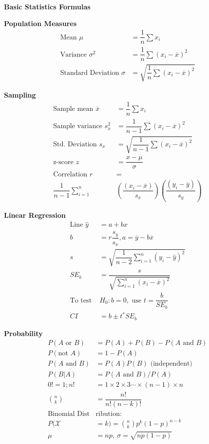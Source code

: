 \documentclass[10pt,letterpaper, landscape]{article}
\begin{document}
\thispagestyle{empty}
\setlength{\parindent}{0pt}
\setlength{\columnseprule}{0.4pt}
\setlength{\columnsep}{3ex}

{\LARGE \begin{center}
\textbf{Basic Statistics  Formulas}
\end{center}}
\begin{multicols}{3}
{\large \textbf{Population Measures}}
\begin{align}
\text{Mean } \mu &= \dfrac{1}{n}\sum x_i\\
\text{Variance } \sigma^2 &= \dfrac{1}{n}\sum(x_i-\overline{x})^2\\
\text{Standard Deviation } \sigma&=\sqrt{\dfrac{1}{n}\sum(x_i-\overline{x})^2}
\end{align}
\hrulefill

{\large \textbf{Sampling}}
\begin{align}
\text{Sample mean } \overline{x} &= \dfrac{1}{n}\sum x_i\\
\text{Sample variance } s_x^2 &= \dfrac{1}{n-1}\sum(x_i-\overline{x})^2\\
\text{Std. Deviation } s_x&=\sqrt{\dfrac{1}{n-1}\sum(x_i-\overline{x})^2}\\
\text{z-score }z&=\dfrac{x-\mu}{\sigma}\\
\text{Correlation }r&=\nonumber \\
\dfrac{1}{n-1}\sum_{i=1}^n &\left(\dfrac{(x_i-\overline{x})}{s_x} \right) \left(\dfrac{(y_i-\overline{y})}{s_y} \right)
\end{align}

\hrulefill

{\large \textbf{Linear Regression}}
\begin{align}
\text{Line } \hat{y}&=a+bx \\
b&=r\dfrac{s_y}{s_x}, 
a=\overline{y}-b\overline{x}  \\
s &=\sqrt{\dfrac{1}{n-2}{\sum_{i=1}^n(y_i-\hat{y})^2}}\\
SE_b &=\dfrac{s}{\sqrt{\displaystyle{\sum_{i=1}^n\left (x_i-\overline{x}\right )^2}}}\\
\text{To test } & H_0:b=0, \text{ use }t = \dfrac{b}{SE_b} \\
CI &= b \pm t^* SE_b
\end{align}



{\large \textbf{Probability}}
\begin{align}
P(A\text{ or } B)&=P(A)+P(B)-P(A\text{ and }B)\\
P(\text{not }A)&=1-P(A)\\
P(A\text{ and }B)&=P(A)P(B)\text{ (independent)} \\
P(B|A)&=P(A\text{ and } B)/{P(A)}\\
0!=1; 
n! &= 1\times 2 \times 3 \cdots \times (n-1)\times n\\
\binom{n}{k}&=\dfrac{n!}{n!(n-k)!}\\
\text{Binomial Dist}&\text{ribution}:\nonumber\\
P(\mathcal{X}&=k)=\binom{n}{k}p^k(1-p)^{n-k}\\
\mu&=np, \ \sigma = \sqrt{np(1-p)}
\end{align}





\end{multicols}
\end{document}
